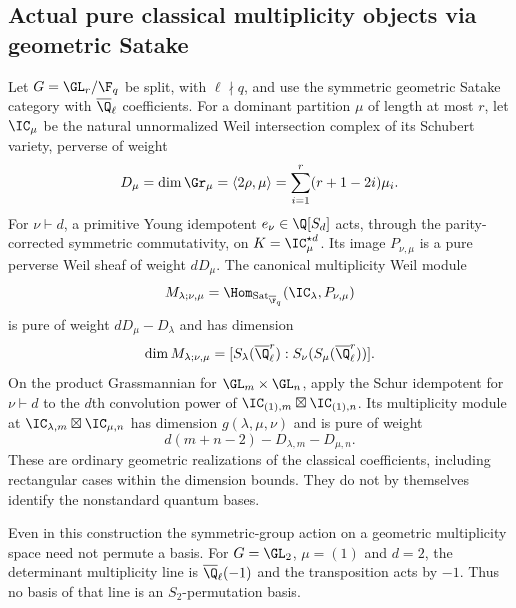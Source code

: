 \subsection{Actual pure classical multiplicity objects via geometric Satake}
\begin{finding}\label{f:satake}
Let $G=\GL_r/\F_q$ be split, with $\ell\nmid q$, and use the symmetric geometric Satake category with $\overline\Q_\ell$ coefficients. For a dominant partition $\mu$ of length at most $r$, let $\IC_\mu$ be the natural unnormalized Weil intersection complex of its Schubert variety, perverse of weight
\[
 D_\mu=\dim\Gr_\mu=\langle2\rho,\mu\rangle
 =\sum_{i=1}^r(r+1-2i)\mu_i.
\]
For $\nu\vdash d$, a primitive Young idempotent $e_\nu\in\Q[S_d]$ acts, through the parity-corrected symmetric commutativity, on
$K=\IC_\mu^{\star d}$. Its image $P_{\nu,\mu}$ is a pure perverse Weil sheaf of weight $dD_\mu$. The canonical multiplicity Weil module
\[
 M_{\lambda;\nu,\mu}
 =\Hom_{\mathrm{Sat}_{\overline{\F}_q}}
 (\IC_\lambda,P_{\nu,\mu})
\]
is pure of weight $dD_\mu-D_\lambda$ and has dimension
\[
 \dim M_{\lambda;\nu,\mu}
 =[S_\lambda(\overline\Q_\ell^r):
   S_\nu(S_\mu(\overline\Q_\ell^r))].
\]
On the product Grassmannian for $\GL_m\times\GL_n$, apply the Schur idempotent for $\nu\vdash d$ to the $d$th convolution power of
$\IC_{(1),m}\boxtimes\IC_{(1),n}$. Its multiplicity module at
$\IC_{\lambda,m}\boxtimes\IC_{\mu,n}$ has dimension $g(\lambda,\mu,\nu)$ and is pure of weight
\[
 d(m+n-2)-D_{\lambda,m}-D_{\mu,n}.
\]
These are ordinary geometric realizations of the classical coefficients, including rectangular cases within the dimension bounds. They do not by themselves identify the nonstandard quantum bases.

Even in this construction the symmetric-group action on a geometric multiplicity space need not permute a basis. For $G=\GL_2$, $\mu=(1)$ and $d=2$, the determinant multiplicity line is $\overline\Q_\ell(-1)$ and the transposition acts by $-1$. Thus no basis of that line is an $S_2$-permutation basis.
\end{finding}
